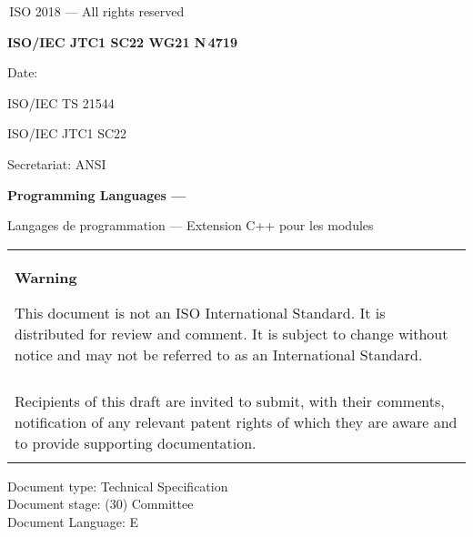 
\def\frtitle{Extension C++ pour les modules}

\thispagestyle{empty}
{\raisebox{.35ex}{\smaller\copyright}}\,ISO 2018 --- All rights reserved
\vspace{2ex}

\begin{flushright}
\textbf{ISO/IEC JTC1 SC22 WG21 N\,\LARGE 4719}

Date: \reldate

ISO/IEC TS 21544

ISO/IEC JTC1 SC22

Secretariat: ANSI

\end{flushright}

\vfill

\textbf{\LARGE Programming Languages --- \doctitle}

Langages de programmation --- \frtitle

\vfill

\begin{tabular}{|p{\hsize}|}
\hline
\begin{center}
\textbf{Warning}
\end{center}

\vspace{2ex}

This document is not an ISO International Standard. It is distributed
for review and comment. It is subject to change without notice and may
not be referred to as an International Standard.\\\\

Recipients of this draft are invited to submit, with their comments,
notification of any relevant patent rights of which they are aware
and to provide supporting documentation.\\\\
\hline
\end{tabular}

\vfill
\noindent
Document type: Technical Specification\\
Document stage: (30) Committee\\
Document Language: E
\pagebreak

\thispagestyle{cpppage}

